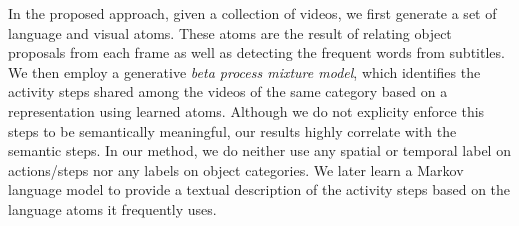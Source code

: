 
In the proposed approach, given a collection of videos, we first generate a set of language and visual atoms. These atoms are the result of relating object proposals from each frame as well as detecting the frequent words from subtitles. We then employ a generative \emph{beta process mixture model}, which identifies the activity steps shared among the videos of the same category based on a representation using learned atoms. Although we do not explicity enforce this steps to be semantically meaningful, our results highly correlate with the semantic steps. In our method, we do neither use any spatial or temporal label on actions/steps nor any labels on object categories. We later learn a Markov language model to provide a textual description of the activity steps based on the language atoms it frequently uses.



